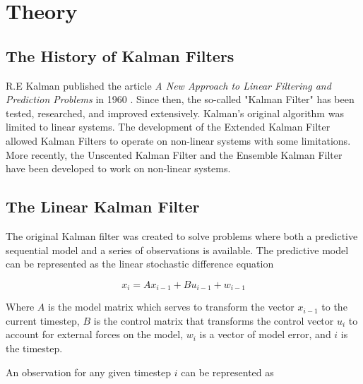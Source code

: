 \chapter{Theory}



\section{The History of Kalman Filters}

R.E Kalman published the article \textit{A New Approach to Linear Filtering and Prediction Problems} in 1960 \cite{Kalman1960}. Since then, the so-called "Kalman Filter" has been tested, researched, and improved extensively. Kalman's original algorithm was limited to linear systems. The development of the Extended Kalman Filter allowed Kalman Filters to operate on non-linear systems with some limitations. More recently, the Unscented Kalman Filter \cite{Julier1997} and the Ensemble Kalman Filter \cite{Evensen1994} have been developed to work on non-linear systems.

\section{The Linear Kalman Filter}

The original Kalman filter was created to solve problems where both a predictive sequential model and a series of observations is available. The predictive model can be represented as the linear stochastic difference equation
\begin{large}
\begin{equation}\label{eq:2p1}
x_{i} = Ax_{i-1} + Bu_{i-1} + w_{i-1}
\end{equation}
\end{large}

Where $A$ is the model matrix which serves to transform the vector $x_{i-1}$ to the current timestep, $B$ is the control matrix that transforms the control vector $u_{i}$ to account for external forces on the model, $w_{i}$ is a vector of model error, and $i$ is the timestep.

An observation for any given timestep $i$ can be represented as 

